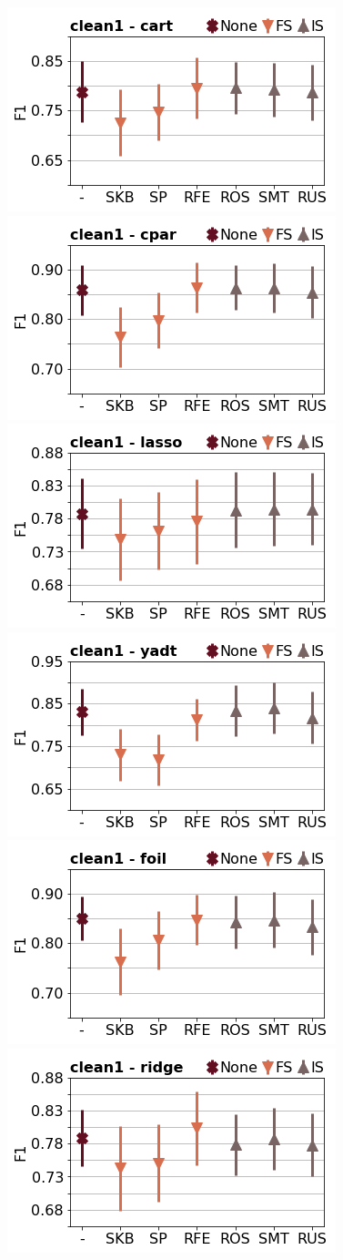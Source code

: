 \documentclass[runningheads,a4paper]{llncs}
\begin{document}
\begin{figure}[!h]
\includegraphics[width=0.32\linewidth]{fig/preps_clean1_DT_sklearn_f1score.png}
\includegraphics[width=0.32\linewidth]{fig/preps_clean1_RB_cpar_f1score.png}
\includegraphics[width=0.32\linewidth]{fig/preps_clean1_LM_lasso_f1score.png}
\includegraphics[width=0.32\linewidth]{fig/preps_clean1_DT_yadt_f1score.png}
\includegraphics[width=0.32\linewidth]{fig/preps_clean1_RB_foil_f1score.png}
\includegraphics[width=0.32\linewidth]{fig/preps_clean1_LM_ridge_f1score.png}
\end{figure}
\end{document}
